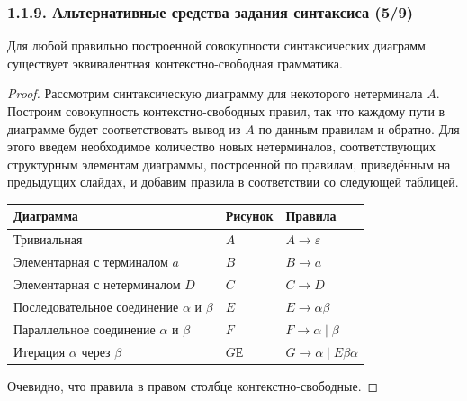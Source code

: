 \begin{frame}
\frametitle{1.1.9. Альтернативные средства задания синтаксиса (5/9)}

\begin{theorem}
Для любой правильно построенной совокупности синтаксических
диаграмм существует эквивалентная 
контекстно-свободная грамматика.
\end{theorem}

\begin{proof}
Рассмотрим синтаксическую диаграмму для некоторого нетерминала
$A$. Построим совокупность контекстно-свободных правил, так что
каждому пути в диаграмме будет соответствовать вывод из $A$ по
данным правилам и обратно. Для этого введем необходимое количество
новых нетерминалов, соответствующих структурным элементам
диаграммы, построенной по правилам, приведённым на
предыдущих слайдах, и добавим правила в
соответствии со следующей таблицей.

\begin{tabular}{|l|l|l|}
\hline
Диаграмма & Рисунок & Правила \\
\hline
Тривиальная &  $A$ & $A\rightarrow\varepsilon$ \\
Элементарная с терминалом $a$ & $B$ & $B\rightarrow a$ \\
Элементарная с нетерминалом $D$& $C$ & $C\rightarrow D$ \\
Последовательное соединение $\alpha$ и $\beta$&  $E$ & $E\rightarrow \alpha\beta$ \\
Параллельное соединение $\alpha$ и $\beta$& $F$ & $F\rightarrow \alpha\mid\beta$\\
Итерация $\alpha$ через $\beta$& $G$Е & $G\rightarrow \alpha\mid E \beta\alpha$\\
\hline
\end{tabular}

Очевидно, что правила в правом столбце контекстно-свободные.
\end{proof}

\end{frame}

